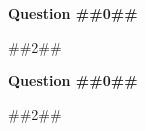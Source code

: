 
\begin{minipage}{\linewidth}

\raggedcolumns
\setlength{\columnseprule}{0.5pt}
\begin{multicols}{2}

\textbf{Question ##{{0}}##} \par
##{{2}}##

\columnbreak

\textbf{Question ##{{0}}##} \par
##{{2}}##

\end{multicols}
\end{minipage}

